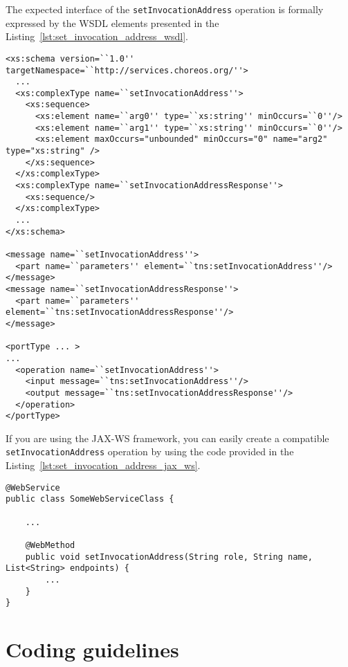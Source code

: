 The expected interface of the \texttt{setInvocationAddress} operation is formally expressed by the WSDL elements presented in the Listing~\ref{lst:set_invocation_address_wsdl}. 

{\footnotesize
\begin{lstlisting}[caption=Parts of the service WSDL that define the \texttt{setInvocationAddress} operation, label=lst:set_invocation_address_wsdl] 
<xs:schema version=``1.0'' targetNamespace=``http://services.choreos.org/''>
  ...
  <xs:complexType name=``setInvocationAddress''>
    <xs:sequence>
      <xs:element name=``arg0'' type=``xs:string'' minOccurs=``0''/>
      <xs:element name=``arg1'' type=``xs:string'' minOccurs=``0''/>
      <xs:element maxOccurs="unbounded" minOccurs="0" name="arg2" type="xs:string" />
    </xs:sequence>
  </xs:complexType>
  <xs:complexType name=``setInvocationAddressResponse''>
    <xs:sequence/>
  </xs:complexType>
  ...
</xs:schema>

<message name=``setInvocationAddress''>
  <part name=``parameters'' element=``tns:setInvocationAddress''/>
</message>
<message name=``setInvocationAddressResponse''>
  <part name=``parameters'' element=``tns:setInvocationAddressResponse''/>
</message>

<portType ... >
...
  <operation name=``setInvocationAddress''>
    <input message=``tns:setInvocationAddress''/>
    <output message=``tns:setInvocationAddressResponse''/>
  </operation>
</portType>
\end{lstlisting}
}

If you are using the JAX-WS framework, you can easily create a compatible \texttt{setInvocationAddress} operation by using the code provided in the Listing~\ref{lst:set_invocation_address_jax_ws}.

\newpage

\lstset{
language=Java
}

{\footnotesize
\begin{lstlisting}[caption=Implementing \texttt{setInvocationAddress} with JAX-WS, label=lst:set_invocation_address_jax_ws] 
@WebService
public class SomeWebServiceClass {

    ...
    
    @WebMethod
    public void setInvocationAddress(String role, String name, List<String> endpoints) {
		...
    }
}
\end{lstlisting}
}

\section{Coding guidelines}

